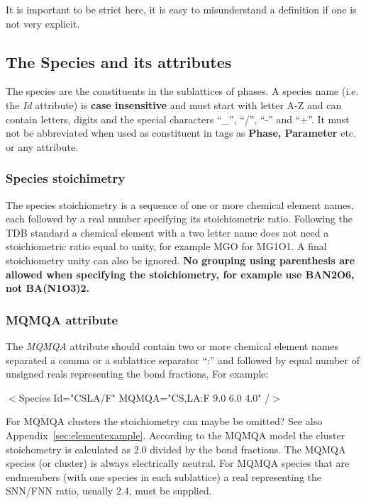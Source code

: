 \documentclass{article}
\begin{document}
It is important to be strict here, it is easy to misunderstand a
definition if one is not very explicit.

\subsection{The Species and its attributes}\label{sec:speciesID}

The species are the constituents in the sublattices of phases.  A
species name (i.e. the {\em Id} attribute) is {\bf case insensitive}
and must start with letter A-Z and can contain letters, digits and the
special characters ``\_'', ``/'', ``-'' and ``+''.  It must not be
abbreviated when used as constituent in tags as {\bf Phase, Parameter}
etc.  or any attribute.

\subsubsection{Species stoichimetry}\label{sec:speciesSS}

The species stoichiometry is a sequence of one or more chemical
element names, each followed by a real number specifying
its stoichiometric ratio.  Following the TDB standard a chemical
element with a two letter name does not need a stoichiometric ratio
equal to unity, for example MGO for MG1O1.  A final stoichiometry
unity can also be ignored.  {\bf No grouping using parenthesis are
  allowed when specifying the stoichiometry, for example use BAN2O6,
  not BA(N1O3)2.} 

\subsubsection{MQMQA attribute}\label{sec:mqmqa}
The {\em MQMQA} attribute should contain two or more chemical element
names separated a comma or a sublattice separator ``:'' and followed
by equal number of unsigned reals representing the bond fractions, For
example:

  $<$Species Id="CSLA/F"  MQMQA="CS,LA:F  9.0 6.0 4.0" /$>$

For MQMQA clusters the stoichiometry can maybe be omitted?  See also
Appendix~\ref{sec:elementexample}.  According to the MQMQA model the
cluster stoichometry is calculated as 2.0 divided by the bond
fractions.  The MQMQA species (or cluster) is always electrically
neutral.  For MQMQA species that are endmembers (with one species in
each sublattice) a real representing the SNN/FNN ratio, usually 2.4,
must be supplied.
\end{document}
